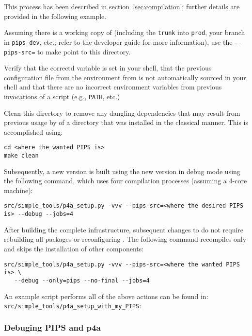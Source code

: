 \documentclass[a4paper]{article}
\begin{document}
This process has been described in section~\ref{sec:compilation};
further details are provided in the following example.

Assuming there is a \Asvn working copy of \Apips (including the \texttt{trunk}
into \texttt{prod}, your branch in \verb|pips_dev|, etc.; refer
to the \Apips developer guide for more information), use the
\verb|--pips-src=| to make \Apfa point to this directory.

Verify that the correctd \Apfa variable is set in your shell, that
the previous configuration file from the \Apips \Asvn environment from
\Acri is not automatically sourced in your shell and that there are no
incorrect environment variables from previous invocations of a script
(e.g., \verb|PATH|, etc.)

Clean this directory to remove any dangling dependencies that may
result from previous
usage by \Apfa of a \Apips directory that was installed in the
classical manner. This is accomplished using:
\begin{verbatim}
cd <where the wanted PIPS is>
make clean
\end{verbatim}

Subsequently, a new \Apfa version is built using the new \Apips
version in debug mode using the following command, which uses
four compilation processes (assuming a 4-core machine):
\begin{verbatim}
src/simple_tools/p4a_setup.py -vvv --pips-src=<where the desired PIPS is> --debug --jobs=4
\end{verbatim}

After building the complete infrastructure, subsequent changes to
\Apips do not require rebuilding all packages or reconfiguring
\Apips. The following command recompiles \Apips only and skips the
installation of other \Apfa components:
\begin{verbatim}
src/simple_tools/p4a_setup.py -vvv --pips-src=<where the wanted PIPS is> \
   --debug --only=pips --no-final --jobs=4
\end{verbatim}

An example script performs all of the above actions can be found in:
\verb|src/simple_tools/p4a_setup_with_my_PIPS|:



\subsubsection{Debuging PIPS and p4a}
\label{sec:debuging-pips-p4a}
\end{document}
